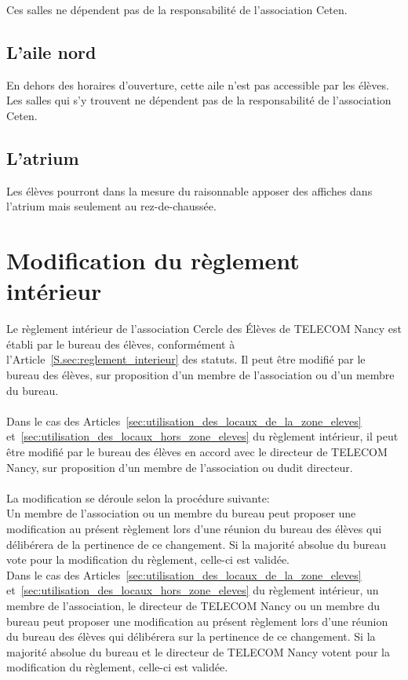 \documentclass{article} %
\begin{document}
				Ces salles ne dépendent pas de la responsabilité de
				l'association Ceten.

		\subsection{L'aile nord}
\label{sub:l_aile_nord}

			En dehors des horaires d’ouverture, cette aile n’est pas accessible
			par les élèves. Les salles qui s’y trouvent ne dépendent pas de la
			responsabilité de l'association Ceten.

		\subsection{L'atrium}
\label{sub:l_atrium}

			Les élèves pourront dans la mesure du raisonnable apposer des
			affiches dans l’atrium mais seulement au rez-de-chaussée.

	\section{Modification du règlement intérieur}
\label{sec:modification_du_reglement_interieur}

		Le règlement intérieur de l’association Cercle des Élèves de TELECOM
		Nancy est établi par le bureau des élèves, conformément à
		l'Article~\ref{S.sec:reglement_interieur} des statuts. Il peut être
		modifié par le bureau des élèves, sur proposition d’un membre de
		l’association ou d’un membre du bureau.

        \paragraph{}
		Dans le cas des
		Articles~\ref{sec:utilisation_des_locaux_de_la_zone_eleves}
		et~\ref{sec:utilisation_des_locaux_hors_zone_eleves} du règlement
		intérieur, il peut être modifié par le bureau des élèves en accord avec
		le directeur de TELECOM Nancy, sur proposition d’un membre de
		l’association ou dudit directeur.

        \paragraph{}
		La modification se déroule selon la procédure suivante:\\
		Un membre de l’association ou un membre du bureau peut proposer une
		modification au présent règlement lors d’une réunion du bureau des
		élèves qui délibérera de la pertinence de ce changement. Si la majorité
		absolue du bureau vote pour la modification du règlement, celle-ci est
		validée.\\
		Dans le cas des
		Articles~\ref{sec:utilisation_des_locaux_de_la_zone_eleves}
		et~\ref{sec:utilisation_des_locaux_hors_zone_eleves} du règlement
		intérieur, un membre de l’association, le directeur de TELECOM Nancy ou
		un membre du bureau peut proposer une modification au présent règlement
		lors d’une réunion du bureau des élèves qui délibérera sur la pertinence
		de ce changement. Si la majorité absolue du bureau et le directeur de
		TELECOM Nancy votent pour la modification du règlement, celle-ci est
		validée.
\end{document}
